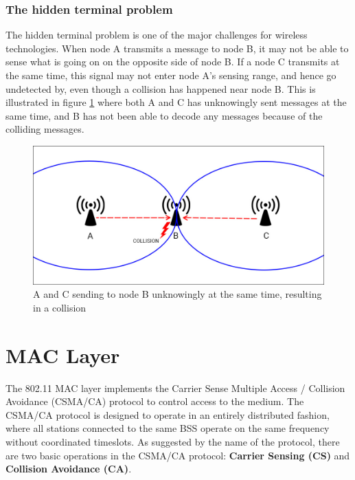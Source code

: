      \subsubsection{The hidden terminal problem}
     The hidden terminal problem is one of the major challenges for wireless technologies. 
     When node A transmits a message to node B, it may not be able to sense what is going on
     on the opposite side of node B. If a node C transmits at the same time, this signal may not enter node A's sensing range, and
     hence go undetected by, even though a collision has happened near node B. This is illustrated in figure \ref{fig:hiddenterminal} where
     both A and C has unknowingly sent messages at the same time, and B has not been able to decode any messages because of the colliding messages. 

     \begin{figure}
     \center
     \includegraphics[scale=0.3]{Images/Hiddenterminalfigure.jpg}
     \caption{A and C sending to node B unknowingly at the same time, resulting in a collision}
     \label{fig:hiddenterminal}
     \end{figure}


     \section{MAC Layer}
     The 802.11 MAC layer implements the Carrier Sense Multiple Access / Collision Avoidance (CSMA/CA) protocol to control access to the medium.
     The CSMA/CA protocol is designed to operate in an entirely distributed fashion, where all stations connected to the same BSS  operate on
     the same frequency without coordinated timeslots. As suggested by the name of the protocol, there are two basic operations in the CSMA/CA protocol:
     \textbf{Carrier Sensing (CS)} and \textbf{Collision Avoidance (CA)}. 

